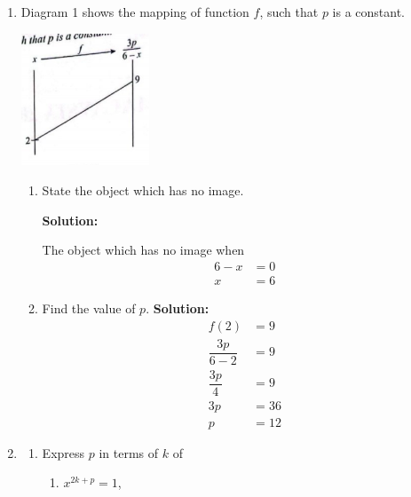 \documentclass{report}
\newcommand{\sol}{\textbf{Solution:}}
\begin{document}
\begin{enumerate}[leftmargin=*]
    \item Diagram 1 shows the mapping of function $f$, such that $p$ is a constant.
          \begin{center}
              \includegraphics[width=0.3\textwidth]{./assets/p1.1.png}
          \end{center}
          \begin{enumerate}
              \item State the object which has no image.

                    \sol{}

                    The object which has no image when
                    \begin{align*}
                        6-x & =0 \\
                        x   & =6
                    \end{align*}

              \item Find the value of $p$. \sol{}
                    \begin{align*}
                        f(2)              & = 9  \\
                        \dfrac{3p}{6 - 2} & = 9  \\
                        \dfrac{3p}{4}     & = 9  \\
                        3p                & = 36 \\
                        p                 & = 12
                    \end{align*}
          \end{enumerate}

    \item \begin{enumerate}
              \item Express $p$ in terms of $k$ of
                    \begin{enumerate}
                        \item $x^{2 k+p}=1$,


\end{enumerate}
\end{enumerate}
\end{enumerate}
\end{document}
